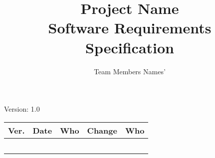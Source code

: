 \documentclass[letterpaper,12pt]{article}
\title{Project Name\\Software Requirements Specification}
\author{Team Members Names'}
\begin{document}
\maketitle

\begin{center}
  Version: 1.0
\end{center}

\vfill
\begin{tabularx}{\linewidth}{|l|l|l|X|l|}\hline
Ver. & Date & Who & Change & Who \\\hline
     &      &     &        &     \\\hline
     &      &     &        &     \\\hline
     &      &     &        &     \\\hline
     &      &     &        &     \\\hline
     &      &     &        &     \\\hline
\end{tabularx}

\newpage







\appendix 



\end{document}
